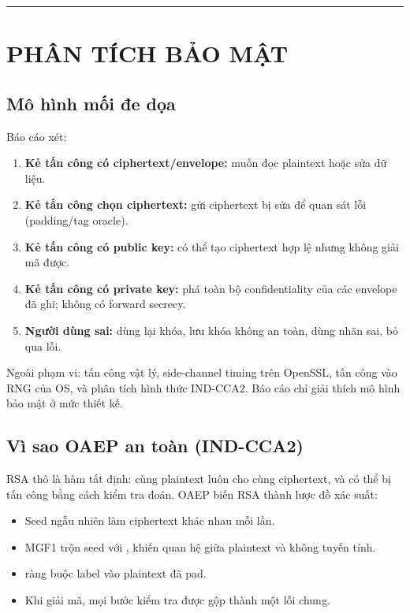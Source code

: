 \documentclass[12pt,a4paper,oneside]{report}
\let\origtexttt\texttt
\renewcommand{\texttt}[1]{\origtexttt{\seqsplit{#1}}}
\begin{document}
\par\noindent\rule{\textwidth}{0.4pt}


\chapter{PHÂN TÍCH BẢO MẬT}


\section{Mô hình mối đe dọa}


Báo cáo xét:


\begin{enumerate}[leftmargin=*]
\item \textbf{Kẻ tấn công có ciphertext/envelope:} muốn đọc plaintext hoặc sửa dữ liệu.
\item \textbf{Kẻ tấn công chọn ciphertext:} gửi ciphertext bị sửa để quan sát lỗi (padding/tag oracle).
\item \textbf{Kẻ tấn công có public key:} có thể tạo ciphertext hợp lệ nhưng không giải mã được.
\item \textbf{Kẻ tấn công có private key:} phá toàn bộ confidentiality của các envelope đã ghi; không có forward secrecy.
\item \textbf{Người dùng sai:} dùng lại khóa, lưu khóa không an toàn, dùng nhãn sai, bỏ qua lỗi.
\end{enumerate}


Ngoài phạm vi: tấn công vật lý, side-channel timing trên OpenSSL, tấn công vào RNG của OS, và phân tích hình thức IND-CCA2. Báo cáo chỉ giải thích mô hình bảo mật ở mức thiết kế.


\section{Vì sao OAEP an toàn (IND-CCA2)}


RSA thô là hàm tất định: cùng plaintext luôn cho cùng ciphertext, và có thể bị tấn công bằng cách kiểm tra đoán. OAEP biến RSA thành lược đồ xác suất:


\begin{itemize}[leftmargin=*]
\item Seed ngẫu nhiên làm ciphertext khác nhau mỗi lần.
\item MGF1 trộn seed với \texttt{DB}, khiến quan hệ giữa plaintext và \texttt{EM} không tuyến tính.
\item \texttt{lHash} ràng buộc label vào plaintext đã pad.
\item Khi giải mã, mọi bước kiểm tra được gộp thành một lỗi chung.
\end{itemize}
\end{document}
